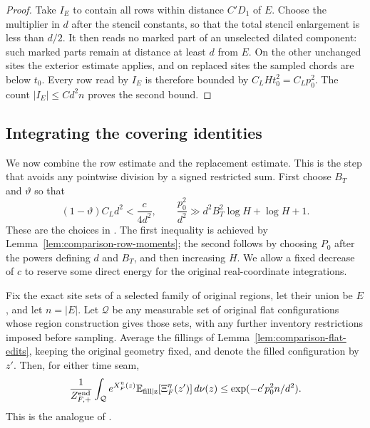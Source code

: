\begin{proof}
Take \(I_E\) to contain all rows within distance \(C'D_1\) of \(E\).
Choose the multiplier in \(d\) after the stencil constants, so that
the total stencil enlargement is less than \(d/2\).  It then reads no
marked part of an unselected dilated component: such marked parts
remain at distance at least \(d\) from \(E\).  On the other unchanged
sites the exterior estimate applies, and on replaced sites the sampled
chords are below \(t_0\).  Every row read by \(I_E\) is therefore
bounded by \(C_LHt_0^2=C_Lp_0^2\).  The count
\(|I_E|\le Cd^2n\) proves the second bound.
\end{proof}

\subsection{Integrating the covering identities}
\label{subsec:comparison-covering-algebra}

We now combine the row estimate and the replacement estimate.  This is
the step that avoids any pointwise division by a signed restricted sum.
First choose \(B_T\) and \(\vartheta\) so that
\begin{equation}
 (1-\vartheta)C_Ld^2<\frac{c}{4d^2},
 \qquad
 \frac{p_0^2}{d^2}\gg d^2B_T^2\log H+\log H+1.
 \label{eq:comparison-parameter-choices}
\end{equation}
These are the choices in \cite[Equations~(7.9)--(7.10)]{O3Continuum}.
The first inequality is achieved by Lemma~\ref{lem:comparison-row-moments};
the second follows by choosing \(P_0\) after the powers defining
\(d\) and \(B_T\), and then increasing \(H\).  We allow a fixed decrease
of \(c\) to reserve some direct energy for the original real-coordinate
integrations.

\begin{lemma}
\label{lem:comparison-edit-gain}
Fix the exact site sets of a selected family of original regions, let their union
be \(E\), and let \(n=|E|\).  Let \(\mathcal Q\) be any measurable set
of original flat configurations whose region construction gives those sets,
with any further inventory restrictions imposed before sampling.
Average the fillings of
Lemma~\ref{lem:comparison-flat-edits}, keeping the original geometry fixed,
and denote the filled configuration by \(z'\).  Then, for either time seam,
\begin{equation}
 \frac1{Z_{F,+}^{\rm end}}\int_{\mathcal Q}e^{X_F^\eta(z)}
       \mathbb E_{\rm fill\mid z}[\Xi_F^\eta(z')]\,d\nu(z)
 \le \exp(-c'p_0^2n/d^2).
\label{eq:comparison-edit-gain}
\end{equation}
This is the analogue of \cite[Equation~(7.15)]{O3Continuum}.
\end{lemma}


